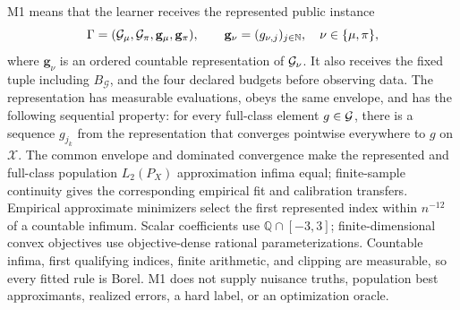 M1 means that the learner receives the represented public instance
\[
 \Gamma=(\mathcal G_\mu,\mathcal G_\pi,\mathbf g_\mu,\mathbf g_\pi),\qquad
 \mathbf g_\nu=(g_{\nu,j})_{j\in\mathbb N},\quad \nu\in\{\mu,\pi\},
\]
where \(\mathbf g_\nu\) is an ordered countable representation of
\(\mathcal G_\nu\).  It also receives the fixed
tuple including \(B_{\mathcal G}\), and the four declared budgets before
observing data.  The representation has measurable evaluations, obeys the
same envelope, and has the following sequential property: for every
full-class element \(g\in\mathcal G\), there is a sequence \(g_{j_k}\) from the
representation that converges pointwise everywhere to \(g\) on \(\mathcal X\).
The common envelope and dominated convergence make the represented and
full-class population \(L_2(P_X)\) approximation infima equal; finite-sample
continuity gives the corresponding empirical fit and calibration transfers.
Empirical approximate minimizers select the first represented index within
\(n^{-12}\) of a countable infimum.
Scalar coefficients use \(\mathbb Q\cap[-3,3]\); finite-dimensional convex
objectives use objective-dense rational parameterizations.  Countable
infima, first qualifying indices, finite arithmetic, and clipping are
measurable, so every fitted rule is Borel.  M1 does not supply nuisance truths,
population best approximants, realized errors, a hard label, or an
optimization oracle.

